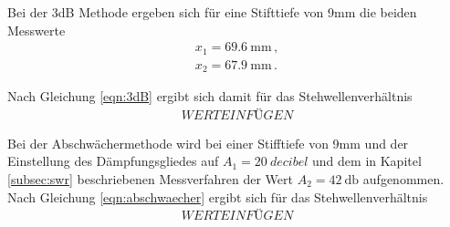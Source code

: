 Bei der 3dB Methode ergeben sich für eine Stifttiefe von 9mm die beiden Messwerte
\begin{align*}
  x_1=\SI{69.6}{\milli\metre} \,, \\
  x_2=\SI{67.9}{\milli\metre} \,.
\end{align*}

Nach Gleichung \eqref{eqn:3dB} ergibt sich damit für das Stehwellenverhältnis
\begin{align*}
  WERT EINFÜGEN
\end{align*}

Bei der Abschwächermethode wird bei einer Stifftiefe von 9mm und der Einstellung
des Dämpfungsgliedes auf $A_1=\SI{20}{decibel}$ und dem in Kapitel \ref{subsec:swr}
beschriebenen Messverfahren der Wert $A_2=\SI{42}{\decibel}$ aufgenommen. Nach
Gleichung \eqref{eqn:abschwaecher} ergibt sich für das Stehwellenverhältnis
\begin{align*}
  WERT EINFÜGEN
\end{align*}
